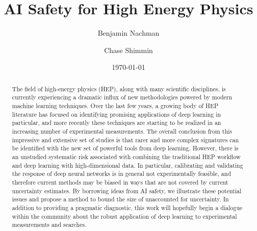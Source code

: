 \documentclass[reprint,nofootinbib,...]{revtex4-1}
\begin{document}
\title{AI Safety for High Energy Physics}

\author{Benjamin Nachman}


\author{Chase Shimmin}



\begin{abstract}

The field of high-energy physics (HEP), along with many scientific disciplines, is currently experiencing a dramatic influx of new methodologies powered by modern machine learning techniques.
Over the last few years, a growing body of HEP literature has focused on identifying promising applications of deep learning in particular, and more recently these techniques are starting to be realized in an increasing number of experimental measurements.
The overall conclusion from this impressive and extensive set of studies is that rarer and more complex signatures can be identified with the new set of powerful tools from deep learning.  However, there is an unstudied systematic risk associated with combining the traditional HEP workflow and deep learning with high-dimensional data.
In particular, calibrating and validating the response of deep neural networks is in general not experimentally feasible, and therefore current methods may be biased in ways that are not covered by current uncertainty estimates.
By borrowing ideas from AI safety, we illustrate these potential issues and propose a method to bound the size of unaccounted for uncertainty.
In addition to providing a pragmatic diagnostic, this work will hopefully begin a dialogue within the community about the robust application of deep learning to experimental measurements and searches.
\end{abstract}

\date{\today}
\maketitle
\end{document}
